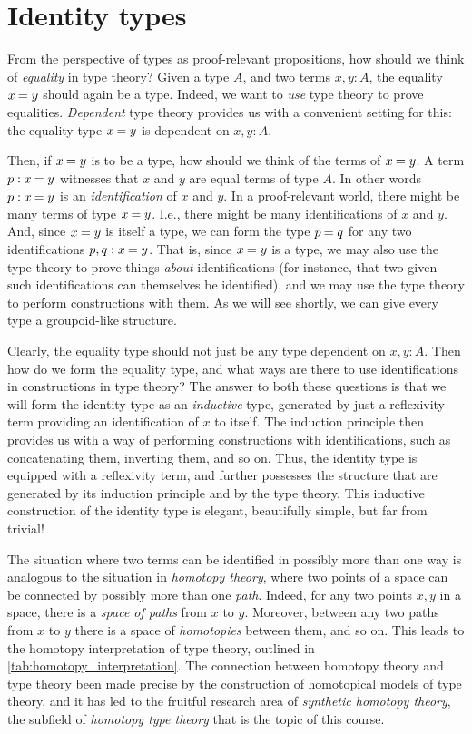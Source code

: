 \section{Identity types}\label{chap:identity}
From the perspective of types as proof-relevant propositions, how should we think of \emph{equality} in type theory? Given a type $A$, and two terms $x,y:A$, the equality $\id{x}{y}$ should again be a type. Indeed, we want to \emph{use} type theory to prove equalities. \emph{Dependent} type theory provides us with a convenient setting for this: the equality type $\id{x}{y}$ is dependent on $x,y:A$. 

Then, if $\id{x}{y}$ is to be a type, how should we think of the terms of $\id{x}{y}$. A term $p:\id{x}{y}$ witnesses that $x$ and $y$ are equal terms of type $A$. In other words $p:\id{x}{y}$ is an \emph{identification} of $x$ and $y$. In a proof-relevant world, there might be many terms of type $\id{x}{y}$. I.e., there might be many identifications of $x$ and $y$. And, since $\id{x}{y}$ is itself a type, we can form the type $\id{p}{q}$ for any two identifications $p,q:\id{x}{y}$. That is, since $\id{x}{y}$ is a type, we may also use the type theory to prove things \emph{about} identifications (for instance, that two given such identifications can themselves be identified), and we may use the type theory to perform constructions with them. As we will see shortly, we can give every type a groupoid-like structure.

Clearly, the equality type should not just be any type dependent on $x,y:A$. Then how do we form the equality type, and what ways are there to use identifications in constructions in type theory? The answer to both these questions is that we will form the identity type as an \emph{inductive} type, generated by just a reflexivity term providing an identification of $x$ to itself. The induction principle then provides us with a way of performing constructions with identifications, such as concatenating them, inverting them, and so on. Thus, the identity type is equipped with a reflexivity term, and further possesses the structure that are generated by its induction principle and by the type theory. This inductive construction of the identity type is elegant, beautifully simple, but far from trivial!

The situation where two terms can be identified in possibly more than one way is analogous to the situation in \emph{homotopy theory}, where two points of a space can be connected by possibly more than one \emph{path}. Indeed, for any two points $x,y$ in a space, there is a \emph{space of paths} from $x$ to $y$. Moreover, between any two paths from $x$ to $y$ there is a space of \emph{homotopies} between them, and so on. This leads to the homotopy interpretation of type theory, outlined in \cref{tab:homotopy_interpretation}. The connection between homotopy theory and type theory been made precise by the construction of homotopical models of type theory, and it has led to the fruitful research area of \emph{synthetic homotopy theory}, the subfield of \emph{homotopy type theory} that is the topic of this course.

